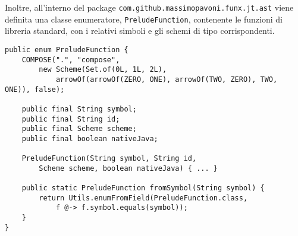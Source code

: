 Inoltre, all'interno del package \texttt{com.github.massimopavoni.funx.jt.ast} viene definita una classe enumeratore,
\texttt{PreludeFunction}, contenente le funzioni di libreria standard, con i relativi simboli e gli schemi di tipo corrispondenti.

\vspace{4mm}
\begin{lstlisting}[caption={Parte del codice di \texttt{PreludeFunction}}, style=javaCode, label={lst:5-6-preludefunction-java}]
public enum PreludeFunction {
    COMPOSE(".", "compose",
        new Scheme(Set.of(0L, 1L, 2L),
            arrowOf(arrowOf(ZERO, ONE), arrowOf(TWO, ZERO), TWO, ONE)), false);

    public final String symbol;
    public final String id;
    public final Scheme scheme;
    public final boolean nativeJava;

    PreludeFunction(String symbol, String id,
        Scheme scheme, boolean nativeJava) { ... }

    public static PreludeFunction fromSymbol(String symbol) {
        return Utils.enumFromField(PreludeFunction.class,
            f @-> f.symbol.equals(symbol));
    }
}
\end{lstlisting}

\newpage

